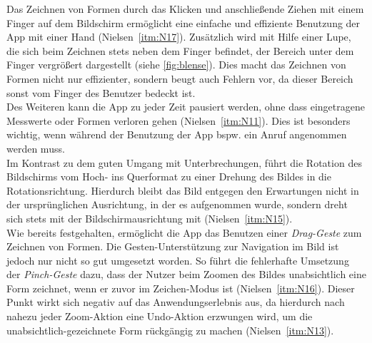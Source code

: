 Das Zeichnen von Formen durch das Klicken und anschließende Ziehen mit einem Finger auf dem Bildschirm ermöglicht eine einfache und effiziente Benutzung der App mit einer Hand (Nielsen~\autoref{itm:N17}).
Zusätzlich wird mit Hilfe einer Lupe, die sich beim Zeichnen stets neben dem Finger befindet, der Bereich unter dem Finger vergrößert dargestellt (siehe \autoref{fig:blense}).
Dies macht das Zeichnen von Formen nicht nur effizienter, sondern beugt auch Fehlern vor, da dieser Bereich sonst vom Finger des Benutzer bedeckt ist. \\

Des Weiteren kann die App zu jeder Zeit pausiert werden, ohne dass eingetragene Messwerte oder Formen verloren gehen (Nielsen~\autoref{itm:N11}). 
Dies ist besonders wichtig, wenn während der Benutzung der App bspw. ein Anruf angenommen werden muss. \\

Im Kontrast zu dem guten Umgang mit Unterbrechungen, führt die Rotation des Bildschirms vom Hoch- ins Querformat zu einer Drehung des Bildes in die Rotationsrichtung.
Hierdurch bleibt das Bild entgegen den Erwartungen nicht in der ursprünglichen Ausrichtung, in der es aufgenommen wurde, sondern dreht sich stets mit der Bildschirmausrichtung mit (Nielsen~\autoref{itm:N15}). \\

Wie bereits festgehalten, ermöglicht die App das Benutzen einer \emph{Drag-Geste} zum Zeichnen von Formen.
Die Gesten-Unterstützung zur Navigation im Bild ist jedoch nur nicht so gut umgesetzt worden.
So führt die fehlerhafte Umsetzung der \emph{Pinch-Geste} dazu, dass der Nutzer beim Zoomen des Bildes unabsichtlich eine Form zeichnet, wenn er zuvor im Zeichen-Modus ist (Nielsen~\autoref{itm:N16}).
Dieser Punkt wirkt sich negativ auf das Anwendungserlebnis aus, da hierdurch nach nahezu jeder Zoom-Aktion eine Undo-Aktion erzwungen wird, um die unabsichtlich-gezeichnete Form rückgängig zu machen (Nielsen~\autoref{itm:N13}). \\

